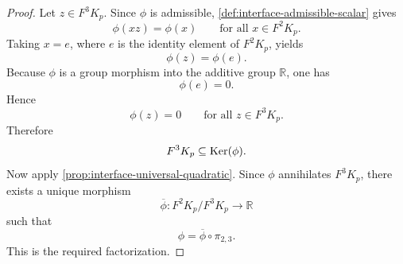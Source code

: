 \begin{proof}
	Let \(z\in F^3K_p\).
	Since \(\phi\) is admissible, \cref{def:interface-admissible-scalar}
	gives
	\[
		\phi(xz)=\phi(x)
		\qquad
		\text{for all }x\in F^2K_p.
	\]
	Taking \(x=e\), where \(e\) is the identity element of \(F^2K_p\),
	yields
	\[
		\phi(z)=\phi(e).
	\]
	Because \(\phi\) is a group morphism into the additive group
	\(\mathbb R\), one has
	\[
		\phi(e)=0.
	\]
	Hence
	\[
		\phi(z)=0
		\qquad
		\text{for all }z\in F^3K_p.
	\]
	Therefore
	\[
		F^3K_p\subseteq \operatorname{Ker}(\phi).
	\]
	Now apply \cref{prop:interface-universal-quadratic}. Since \(\phi\)
	annihilates \(F^3K_p\), there exists a unique morphism
	\[
		\overline\phi:F^2K_p/F^3K_p\to\mathbb R
	\]
	such that
	\[
		\phi=\overline\phi\circ \pi_{2,3}.
	\]
	This is the required factorization.
\end{proof}
